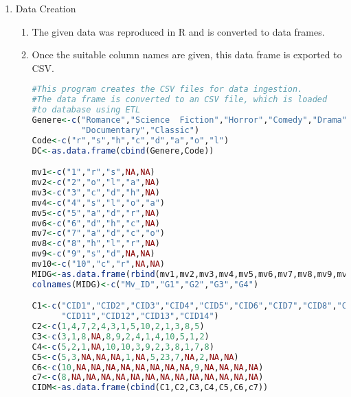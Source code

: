 \documentclass{article}
\begin{document}
\begin{enumerate}
\item Data Creation
\begin{enumerate}
\item The given data was reproduced in R and is converted to data frames.
\item Once the suitable column names are given, this data frame is exported to CSV.
\begin{lstlisting}[language=R]
#This program creates the CSV files for data ingestion. 
#The data frame is converted to an CSV file, which is loaded 
#to database using ETL 
Genere<-c("Romance","Science  Fiction","Horror","Comedy","Drama","Action",
          "Documentary","Classic")
Code<-c("r","s","h","c","d","a","o","l")
DC<-as.data.frame(cbind(Genere,Code))

mv1<-c("1","r","s",NA,NA)
mv2<-c("2","o","l","a",NA)
mv3<-c("3","c","d","h",NA)
mv4<-c("4","s","l","o","a")
mv5<-c("5","a","d","r",NA)
mv6<-c("6","d","h","c",NA)
mv7<-c("7","a","d","c","o")
mv8<-c("8","h","l","r",NA)
mv9<-c("9","s","d",NA,NA)
mv10<-c("10","c","r",NA,NA)
MIDG<-as.data.frame(rbind(mv1,mv2,mv3,mv4,mv5,mv6,mv7,mv8,mv9,mv10))
colnames(MIDG)<-c("Mv_ID","G1","G2","G3","G4")

C1<-c("CID1","CID2","CID3","CID4","CID5","CID6","CID7","CID8","CID9","CID10",
      "CID11","CID12","CID13","CID14")
C2<-c(1,4,7,2,4,3,1,5,10,2,1,3,8,5)
C3<-c(3,1,8,NA,8,9,2,4,1,4,10,5,1,2)
C4<-c(5,2,1,NA,10,10,3,9,2,3,8,1,7,8)
C5<-c(5,3,NA,NA,NA,1,NA,5,23,7,NA,2,NA,NA)
C6<-c(10,NA,NA,NA,NA,NA,NA,NA,NA,9,NA,NA,NA,NA)
c7<-c(8,NA,NA,NA,NA,NA,NA,NA,NA,NA,NA,NA,NA,NA)
CIDM<-as.data.frame(cbind(C1,C2,C3,C4,C5,C6,c7))


\end{lstlisting}
\end{enumerate}
\end{enumerate}
\end{document}
